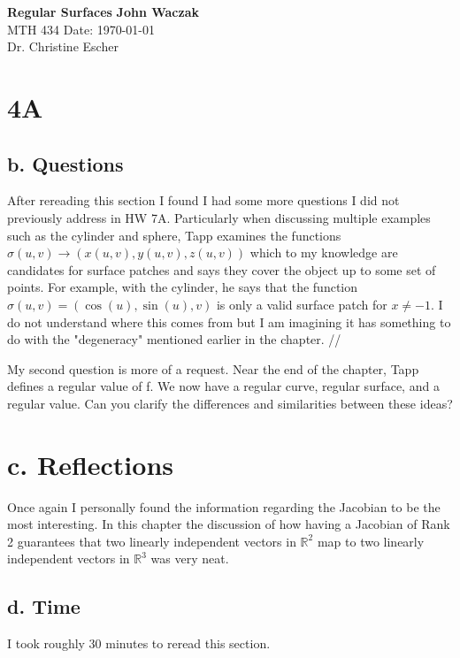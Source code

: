 \documentclass[a4paper, 11pt]{article}
\begin{document}
\noindent
\large\textbf{Regular Surfaces} \hfill \textbf{John Waczak} \\
\normalsize MTH 434 \hfill  Date: \today \\
Dr. Christine Escher \\

\section*{4A}
	\subsection*{b. Questions}
	After rereading this section I found I had some more questions I did not previously address in HW 7A. Particularly when discussing multiple examples such as the cylinder and sphere, Tapp examines the functions $\sigma(u,v)\to (x(u,v), y(u,v), z(u,v))$ which to my knowledge are candidates for surface patches and says they cover the object up to some set of points. For example, with the cylinder, he says that the function $\sigma(u,v) = (\cos(u), \sin(u), v)$ is only a valid surface patch for $x\neq -1$. I do not understand where this comes from but I am imagining it has something to do with the "degeneracy" mentioned earlier in the chapter. //
	
	\noindent My second question is more of a request. Near the end of the chapter, Tapp defines a regular value of f. We now have a regular curve, regular surface, and a regular value. Can you clarify the differences and similarities between these ideas? 
	
	\section*{c. Reflections}
	Once again I personally found the information regarding the Jacobian to be the most interesting. In this chapter the discussion of how having a Jacobian of Rank 2 guarantees that two linearly independent vectors in $\mathbb{R}^2$ map to two linearly independent vectors in $\mathbb{R}^3$ was very neat.  
	\subsection*{d. Time}
	I took roughly 30 minutes to reread this section. 
\end{document}

